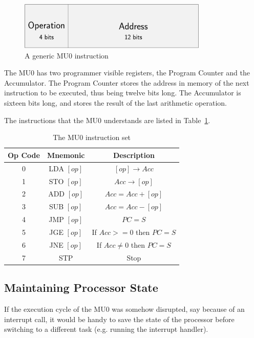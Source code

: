\begin{figure}[ht!]
  \centering
  \includegraphics[width=90mm]{diagrams/instruction.pdf}
  \caption{A generic MU0 instruction}
  \label{instruction}
\end{figure}

The MU0 has two programmer visible registers, the Program Counter and the
Accumulator. The Program Counter stores the address in memory of the next
instruction to be executed, thus being twelve bits long. The Accumulator is
sixteen bits long, and stores the result of the last arithmetic operation.

The instructions that the MU0 understands are listed in
Table~\ref{instruction_set}.

\begin{table}[ht!]
  \centering
  \begin{tabular}{|c|c|c|}
    \hline
    {\bf Op Code} & {\bf Mnemonic} & {\bf Description}\\ \hline
    0 & LDA $[op]$ & $[op] \rightarrow Acc$\\ \hline
    1 & STO $[op]$ & $Acc \rightarrow [op]$\\ \hline
    2 & ADD $[op]$ & $Acc = Acc + [op]$\\ \hline
    3 & SUB $[op]$ & $Acc = Acc - [op]$\\ \hline
    4 & JMP $[op]$ & $PC = S$\\ \hline
    5 & JGE $[op]$ & If $Acc >= 0$ then $PC = S$\\ \hline
    6 & JNE $[op]$ & If $Acc \not= 0$ then $PC = S$\\ \hline
    7 & STP & Stop\\ \hline
  \end{tabular}
  \caption{The MU0 instruction set}
  \label{instruction_set}
\end{table}

\subsection{Maintaining Processor State}

If the execution cycle of the MU0 was somehow disrupted, say because of an
interrupt call, it would be handy to save the state of the processor before
switching to a different task (e.g. running the interrupt handler).

